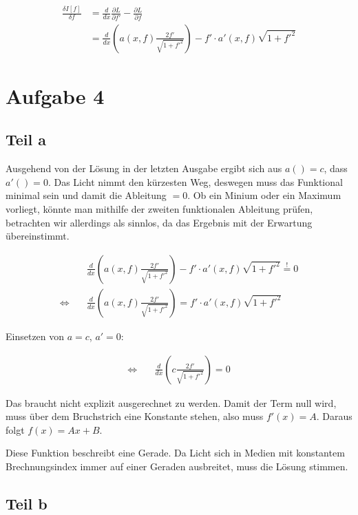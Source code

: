 \documentclass[a4paper,german,12pt,smallheadings]{scrartcl}
\begin{document}
\begin{align*}
  \frac{\delta I[f]}{\delta f} &= \frac{d}{dx} \frac{\partial L}{\partial f'} - \frac{\partial L}{\partial f} \\
  &= \frac{d}{dx} \left(a(x,f) \frac{2f'}{\sqrt{1+f'^2}} \right) - f' \cdot a'(x, f) \sqrt{1+f'^2}
\end{align*}

\section*{Aufgabe 4}
\subsection*{Teil a}

Ausgehend von der Lösung in der letzten Ausgabe ergibt sich aus $a() = c$, dass
$a'() = 0$. Das Licht nimmt den kürzesten Weg, deswegen muss das Funktional
minimal sein und damit die Ableitung $=0$. Ob ein Minium oder ein Maximum
vorliegt, könnte man mithilfe der zweiten funktionalen Ableitung prüfen,
betrachten wir allerdings als sinnlos, da das Ergebnis mit der Erwartung
übereinstimmt.

\begin{align*}
  &\frac{d}{dx} \left(a(x,f) \frac{2f'}{\sqrt{1+f'^2}} \right) - f' \cdot a'(x, f) \sqrt{1+f'^2} \overset{!}{=} 0 \\
  \Leftrightarrow \quad &\frac{d}{dx} \left(a(x,f) \frac{2f'}{\sqrt{1+f'^2}} \right) = f' \cdot a'(x, f) \sqrt{1+f'^2}
\end{align*}

Einsetzen von $a = c$, $a' = 0$:

\begin{align*}
  \Leftrightarrow \quad &\frac{d}{dx} \left(c \frac{2f'}{\sqrt{1+f'^2}} \right) = 0
\end{align*}

Das braucht nicht explizit ausgerechnet zu werden. Damit der Term null wird,
muss über dem Bruchstrich eine Konstante stehen, also muss $f'(x) = A$. Daraus
folgt $f(x) = Ax+B$.

Diese Funktion beschreibt eine Gerade. Da Licht sich in Medien mit konstantem
Brechnungsindex immer auf einer Geraden ausbreitet, muss die Lösung stimmen.

\subsection*{Teil b}
\end{document}
